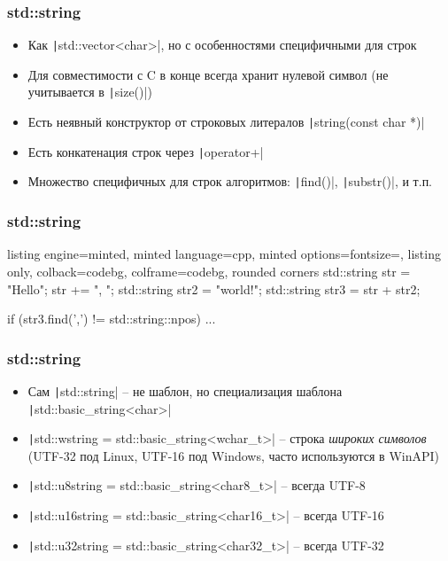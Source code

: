 \documentclass[10pt]{beamer}
\begin{document}
\begin{frame}[fragile]
\frametitle{std::string}
\begin{itemize}
\item Как \texttt|std::vector<char>|, но с особенностями специфичными для строк
\pause
\item Для совместимости с C в конце всегда хранит нулевой символ (не учитывается в \texttt|size()|)
\pause
\item Есть неявный конструктор от строковых литералов \texttt|string(const char *)|
\pause
\item Есть конкатенация строк через \texttt|operator+|
\pause
\item Множество специфичных для строк алгоритмов: \texttt|find()|, \texttt|substr()|, и т.п.
\end{itemize}
\end{frame}

\begin{frame}[fragile]
\frametitle{std::string}
\begin{itemize}
\begin{tcblisting}{listing engine=minted, minted language=cpp, minted options={fontsize=\scriptsize}, listing only, colback=codebg, colframe=codebg, rounded corners}
std::string str = "Hello";
str += ", ";
std::string str2 = "world!";
std::string str3 = str + str2;

if (str3.find(',') != std::string::npos) {
  ...
}
\end{tcblisting}
\end{itemize}
\end{frame}

\begin{frame}[fragile]
\frametitle{std::string}
\begin{itemize}
\item Сам \texttt|std::string| -- не шаблон, но специализация шаблона \texttt|std::basic_string<char>|
\pause
\item \texttt|std::wstring = std::basic_string<wchar_t>| -- строка \textit{широких символов} (UTF-32 под Linux, UTF-16 под Windows, часто используются в WinAPI)
\pause
\item \texttt|std::u8string = std::basic_string<char8_t>| -- всегда UTF-8
\pause
\item \texttt|std::u16string = std::basic_string<char16_t>| -- всегда UTF-16
\pause
\item \texttt|std::u32string = std::basic_string<char32_t>| -- всегда UTF-32
\end{itemize}
\end{frame}
\end{document}
